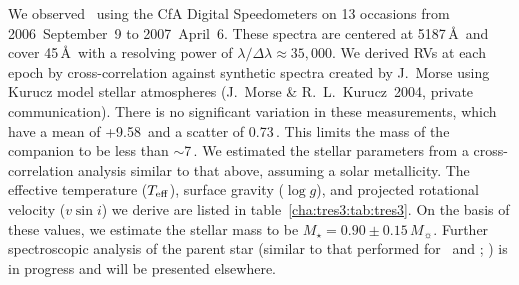 We observed \tresThree\ using the CfA Digital Speedometers \citep{Latham:ASP:1992a} on 13 occasions from 2006~September~9 to 2007~April~6.
These spectra are centered at 5187\,\AA\ and cover 45\,\AA\ with a resolving power of \mbox{$\lambda/\Delta\lambda \approx 35,\!000$}.
We derived RVs at each epoch by cross-correlation against synthetic spectra created by J.~Morse using Kurucz model stellar atmospheres (J.~Morse \& R.~L.~Kurucz~2004, private communication).
There is no significant variation in these measurements, which have a mean of \mbox{+9.58\,\kms} and a scatter of \mbox{0.73\,\kms}.
This limits the mass of the companion to be less than $\sim$7\,\mjup.
We estimated the stellar parameters from a cross-correlation analysis similar to that above, assuming a solar metallicity.
The effective temperature ($T_{\rm eff}$), surface gravity ($\log g$), and projected rotational velocity ($v \sin i$) we derive are listed in table~\ref{cha:tres3:tab:tres3}.
On the basis of these values, we estimate the stellar mass to be $M_{\star}=0.90\pm0.15\,M_{\sun}$.
Further spectroscopic analysis of the parent star (similar to that performed for \tresOne\ and \tresTwo; \citealt{Sozzetti_Yong_Torres:apjl:2004a, Sozzetti_Torres_Charbonneau:apj:2007a}) is in progress and will be presented elsewhere.

